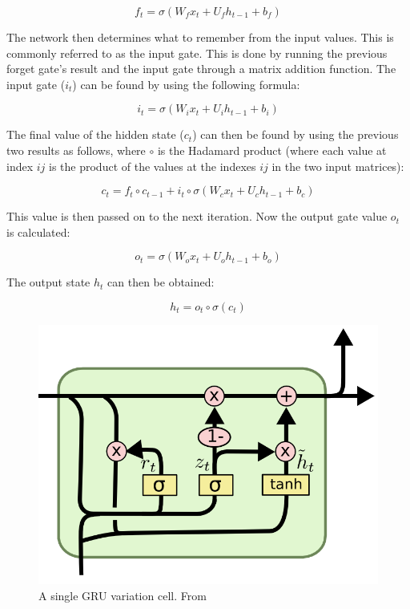 $$ f_t = \sigma(W_f x_t + U_f h_{t-1} + b_f) $$

The network then determines what to remember from the input values. This is commonly referred to as the input gate. This is done by running the previous forget gate's result and the input gate through a matrix addition function. The input gate (\(i_t\)) can be found by using the following formula:

$$ i_t = \sigma(W_i x_t + U_i h_{t-1} + b_i) $$

The final value of the hidden state (\(c_t\)) can then be found by using the previous two results as follows, where \(\circ \) is the Hadamard product (where each value at index \(ij\) is the product of the values at the indexes \(ij\) in the two input matrices): 

$$ c_t = f_t \circ c_{t-1} + i_t \circ \sigma(W_c x_t + U_c h_{t-1} + b_c) $$

This value is then passed on to the next iteration. Now the output gate value \(o_t\) is calculated:

$$ o_t = \sigma(W_o x_t + U_o h_{t-1} + b_o) $$

The output state \(h_t\) can then be obtained:

$$ h_t = o_t \circ \sigma(c_t) $$

\begin{figure}
	\begin{center}
		\includegraphics[scale=0.5]{rnn/gru_cell}
	\end{center}
	\caption{A single GRU variation cell. From~\cite{olah2015understanding}\label{fig:gru_cell}}
\end{figure}

